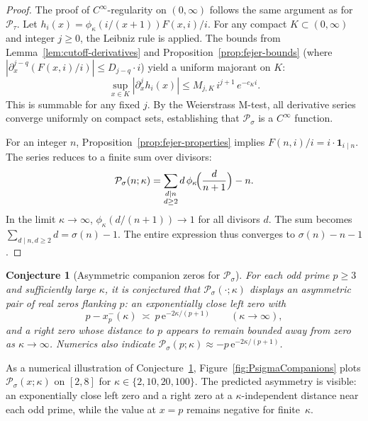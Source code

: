 \documentclass[11pt,a4paper]{amsart}
\theoremstyle{plain}
\newtheorem{conjecture}[theorem]{Conjecture}
\theoremstyle{definition}
\theoremstyle{remark}
\begin{document}
\begin{proof}
The proof of $C^\infty$-regularity on $(0,\infty)$ follows the same argument as for $\mathcal{P}_{\tau}$. Let $h_i(x) = \phi_{\kappa}(i/(x+1)) F(x,i)/i$. For any compact $K\subset(0,\infty)$ and integer $j\ge0$, the Leibniz rule is applied. The bounds from Lemma~\ref{lem:cutoff-derivatives} and Proposition~\ref{prop:fejer-bounds} (where $|\partial_x^{j-q} (F(x,i)/i)| \le D_{j-q} \cdot i$) yield a uniform majorant on $K$:
\[
\sup_{x\in K} |\partial_x^j h_i(x)| \le M_{j,K} \, i^{j+1} \, e^{-c_K i}.
\]
This is summable for any fixed $j$. By the Weierstrass M-test, all derivative series converge uniformly on compact sets, establishing that $\mathcal{P}_{\sigma}$ is a $C^\infty$ function.

For an integer $n$, Proposition~\ref{prop:fejer-properties} implies $F(n,i)/i = i \cdot \mathbf{1}_{i\mid n}$. The series reduces to a finite sum over divisors:
\[
\mathcal{P}_{\sigma}(n;\kappa)=\sum_{\substack{d\mid n\\ d\ge2}} d\,\phi_{\kappa}\!\Bigl(\frac{d}{n+1}\Bigr)-n.
\]
In the limit $\kappa\to\infty$, $\phi_{\kappa}(d/(n+1))\to 1$ for all divisors $d$. The sum becomes $\sum_{d\mid n, d\ge2} d = \sigma(n)-1$. The entire expression thus converges to $\sigma(n)-n-1$.
\end{proof}

\begin{conjecture}[Asymmetric companion zeros for $\mathcal{P}_{\sigma}$]\label{conj:Psigma-companions}
For each odd prime $p\ge 3$ and sufficiently large $\kappa$, it is conjectured that $\mathcal P_\sigma(\cdot;\kappa)$ displays an asymmetric pair of real zeros flanking $p$: an exponentially close left zero with
\[
p - x_p^-(\kappa)\ \asymp\ p\,\mathrm e^{-2\kappa/(p+1)}\qquad(\kappa\to\infty),
\]
and a right zero whose distance to $p$ appears to remain bounded away from zero as $\kappa\to\infty$. Numerics also indicate $\mathcal P_\sigma(p;\kappa) \approx -p\,\mathrm e^{-2\kappa/(p+1)}$.
\end{conjecture}


As a numerical illustration of Conjecture~\ref{conj:Psigma-companions}, 
Figure~\ref{fig:PsigmaCompanions} plots $\mathcal P_\sigma(x;\kappa)$ on $[2,8]$ for 
$\kappa\in\{2,10,20,100\}$. The predicted asymmetry is visible: an exponentially close left zero and a right zero at a $\kappa$-independent distance near each odd prime, while the value at $x=p$ remains negative for finite~$\kappa$.
\end{document}
